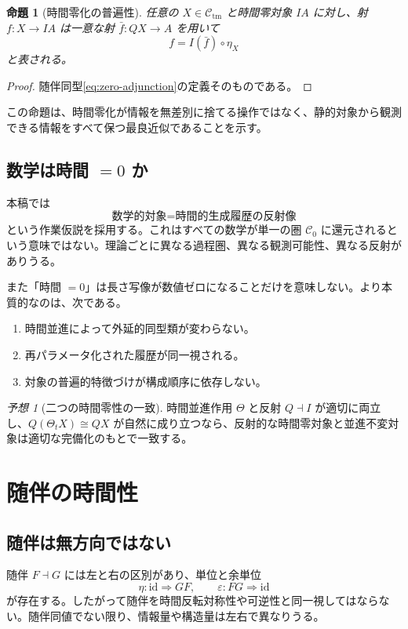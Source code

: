 \documentclass[a4paper,11pt]{ltjsarticle}
\newtheorem{proposition}[definition]{命題}
\theoremstyle{remark}
\newtheorem{conjecture}[definition]{予想}
\newcommand{\C}{\mathcal C}
\newcommand{\id}{\mathrm{id}}
\begin{document}
\begin{proposition}[時間零化の普遍性]
任意の $X\in\C_{\mathrm{tm}}$ と時間零対象 $IA$ に対し、射 $f:X\to IA$ は一意な射 $\bar f:QX\to A$ を用いて
\begin{equation}
 f=I(\bar f)\circ\eta_X
 \end{equation}
と表される。
\end{proposition}

\begin{proof}
随伴同型\eqref{eq:zero-adjunction}の定義そのものである。
\end{proof}

この命題は、時間零化が情報を無差別に捨てる操作ではなく、静的対象から観測できる情報をすべて保つ最良近似であることを示す。

\subsection{数学は時間 $=0$ か}
本稿では
\begin{equation}
 \text{数学的対象}=\text{時間的生成履歴の反射像}
 \label{eq:mathematics-zero}
\end{equation}
という作業仮説を採用する。これはすべての数学が単一の圏 $\C_0$ に還元されるという意味ではない。理論ごとに異なる過程圏、異なる観測可能性、異なる反射がありうる。

また「時間 $=0$」は長さ写像が数値ゼロになることだけを意味しない。より本質的なのは、次である。
\begin{enumerate}
  \item 時間並進によって外延的同型類が変わらない。
  \item 再パラメータ化された履歴が同一視される。
  \item 対象の普遍的特徴づけが構成順序に依存しない。
\end{enumerate}

\begin{conjecture}[二つの時間零性の一致]
時間並進作用 $\Theta$ と反射 $Q\dashv I$ が適切に両立し、$Q(\Theta_tX)\cong QX$ が自然に成り立つなら、反射的な時間零対象と並進不変対象は適切な完備化のもとで一致する。
\end{conjecture}

\section{随伴の時間性}

\subsection{随伴は無方向ではない}
随伴 $F\dashv G$ には左と右の区別があり、単位と余単位
\begin{equation}
 \eta:\id\Rightarrow GF,
 \qquad
 \varepsilon:FG\Rightarrow\id
\end{equation}
が存在する。したがって随伴を時間反転対称性や可逆性と同一視してはならない。随伴同値でない限り、情報量や構造量は左右で異なりうる。
\end{document}
